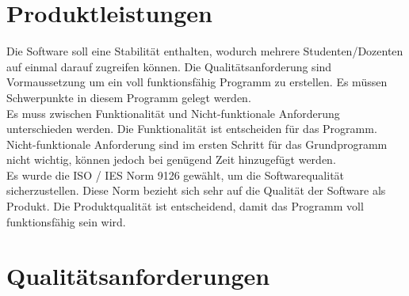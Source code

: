 \documentclass[a4paper,listof=leveldown,listof=numbered]{scrreprt}
\begin{document}
\chapter{Produktleistungen}
	Die Software soll eine Stabilität enthalten, wodurch mehrere Studenten/Dozenten auf einmal darauf zugreifen können. Die Qualitätsanforderung sind Vormaussetzung um ein voll funktionsfähig Programm zu erstellen. Es müssen Schwerpunkte in diesem Programm gelegt werden.\\
	
	Es muss zwischen Funktionalität und Nicht-funktionale Anforderung unterschieden werden. Die Funktionalität ist entscheiden für das Programm. Nicht-funktionale Anforderung sind im ersten Schritt für das Grundprogramm nicht wichtig, können jedoch bei genügend Zeit hinzugefügt werden.\\
	
	Es wurde die ISO / IES Norm 9126 gewählt, um die Softwarequalität sicherzustellen. Diese Norm bezieht sich sehr auf die Qualität der Software als Produkt. Die Produktqualität ist entscheidend, damit das Programm voll funktionsfähig sein wird. 

	
\chapter{Qualitätsanforderungen}
	
	
	
	
\end{document}
